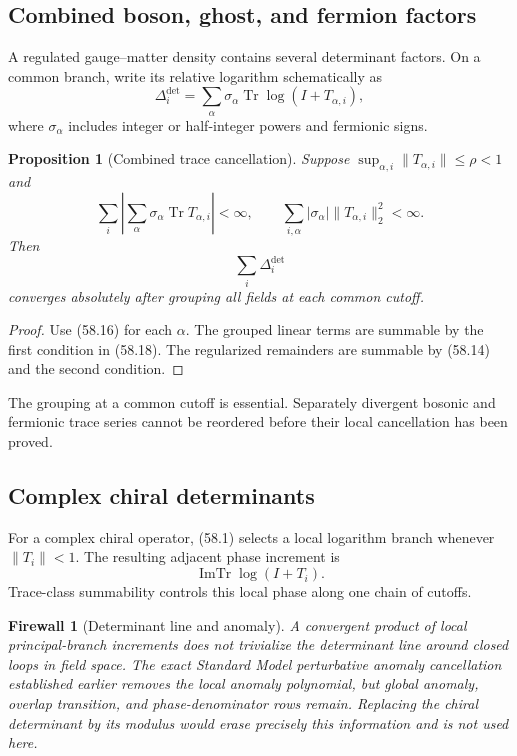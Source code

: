 \documentclass[11pt]{article}
\newtheorem{proposition}[theorem]{Proposition}
\newtheorem{firewall}[theorem]{Firewall}
\begin{document}
\subsection{Combined boson, ghost, and fermion factors}

A regulated gauge--matter density contains several determinant factors.
On a common branch, write its relative logarithm schematically as
\[
                 \Delta_i^{\det}
       =\sum_{\alpha}\sigma_\alpha
          \operatorname{Tr}\log(I+T_{\alpha,i}),              \tag{58.17}
\]
where \(\sigma_\alpha\) includes integer or half-integer powers and
fermionic signs.

\begin{proposition}[Combined trace cancellation]
\label{prop:v11v58-cancellation}
Suppose \(\sup_{\alpha,i}\lVert T_{\alpha,i}\rVert\le\rho<1\) and
\[
 \sum_i\left|
      \sum_\alpha\sigma_\alpha\operatorname{Tr}T_{\alpha,i}
      \right|<\infty,\qquad
 \sum_{i,\alpha}|\sigma_\alpha|
                    \lVert T_{\alpha,i}\rVert_2^2<\infty.     \tag{58.18}
\]
Then
\[
                         \sum_i\Delta_i^{\det}                \tag{58.19}
\]
converges absolutely after grouping all fields at each common cutoff.
\end{proposition}

\begin{proof}
Use (58.16) for each \(\alpha\).  The grouped linear terms are summable
by the first condition in (58.18).  The regularized remainders are
summable by (58.14) and the second condition.
\end{proof}

The grouping at a common cutoff is essential.  Separately divergent
bosonic and fermionic trace series cannot be reordered before their
local cancellation has been proved.

\subsection{Complex chiral determinants}

For a complex chiral operator, (58.1) selects a local logarithm branch
whenever \(\lVert T_i\rVert<1\).  The resulting adjacent phase
increment is
\[
                    \operatorname{ImTr}\log(I+T_i).           \tag{58.20}
\]
Trace-class summability controls this local phase along one chain of
cutoffs.

\begin{firewall}[Determinant line and anomaly]
\label{fire:v11v58-chiral}
A convergent product of local principal-branch increments does not
trivialize the determinant line around closed loops in field space.
The exact Standard Model perturbative anomaly cancellation established
earlier removes the local anomaly polynomial, but global anomaly,
overlap transition, and phase-denominator rows remain.  Replacing the
chiral determinant by its modulus would erase precisely this
information and is not used here.
\end{firewall}
\end{document}
